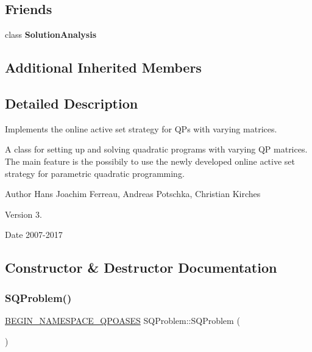 \subsection*{Friends}
\begin{DoxyCompactItemize}
\item 
\mbox{\label{class_s_q_problem_ab55a166adacbc90da27a86b0010c81d7}} 
class {\bfseries Solution\+Analysis}
\end{DoxyCompactItemize}
\subsection*{Additional Inherited Members}


\subsection{Detailed Description}
Implements the online active set strategy for Q\+Ps with varying matrices. 

A class for setting up and solving quadratic programs with varying QP matrices. The main feature is the possibily to use the newly developed online active set strategy for parametric quadratic programming.

\begin{DoxyAuthor}{Author}
Hans Joachim Ferreau, Andreas Potschka, Christian Kirches 
\end{DoxyAuthor}
\begin{DoxyVersion}{Version}
3. 
\end{DoxyVersion}
\begin{DoxyDate}{Date}
2007-\/2017 
\end{DoxyDate}


\subsection{Constructor \& Destructor Documentation}
\mbox{\label{class_s_q_problem_ae1cb6ec33ca0ea3021688d4ed2971b50}} 
\subsubsection{\texorpdfstring{S\+Q\+Problem()}{SQProblem()}\hspace{0.1cm}{\footnotesize\ttfamily [1/3]}}
{\footnotesize\ttfamily \hyperlink{_types_8hpp_afd127fcb3c8f47975e9fa0ec2bacde52}{B\+E\+G\+I\+N\+\_\+\+N\+A\+M\+E\+S\+P\+A\+C\+E\+\_\+\+Q\+P\+O\+A\+S\+ES} S\+Q\+Problem\+::\+S\+Q\+Problem (\begin{DoxyParamCaption}{ }\end{DoxyParamCaption})}

